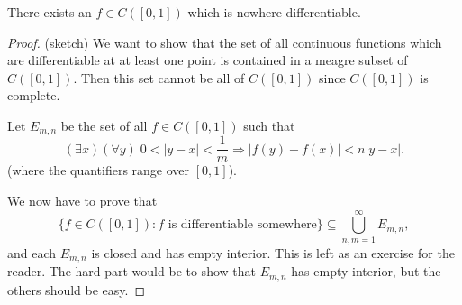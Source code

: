 \documentclass[a4paper]{article}
\begin{document}
\begin{prop}
  There exists an $f\in C([0, 1])$ which is nowhere differentiable.
\end{prop}

\begin{proof}(sketch)
  We want to show that the set of all continuous functions which are differentiable at at least one point is contained in a meagre subset of $C([0, 1])$. Then this set cannot be all of $C([0, 1])$ since $C([0, 1])$ is complete.

  Let $E_{m, n}$ be the set of all $f \in C([0, 1])$ such that
  \[
    (\exists x)(\forall y)\; 0 < |y - x| < \frac{1}{m} \Rightarrow  |f(y) - f(x)| < n|y - x|.
  \]
  (where the quantifiers range over $[0, 1]$).

  We now have to prove that
  \[
    \{f \in C([0, 1]): f\text{ is differentiable somewhere}\} \subseteq \bigcup_{n, m = 1}^\infty E_{m, n},
  \]
  and each $E_{m, n}$ is closed and has empty interior. This is left as an exercise for the reader. The hard part would be to show that $E_{m, n}$ has empty interior, but the others should be easy. %
\end{proof}
\end{document}
